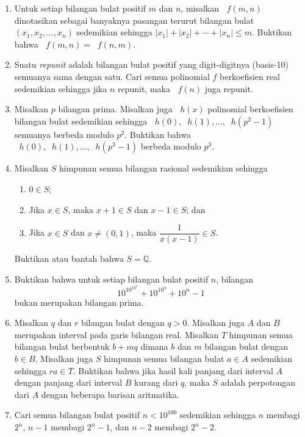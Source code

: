 \documentclass[12pt]{article}
\newcommand*\func[2]{\mathop{}\!{#1}{\left({#2}\right)}}
\begin{document}
\begin{enumerate}[leftmargin=*]
		\item Untuk setiap bilangan bulat positif $ m $ dan $ n $, misalkan $ \func{f}{m, n} $ dinotasikan sebagai banyaknya pasangan terurut bilangan bulat $ \left(x_{1}, x_{2}, \dots, x_{n}\right) $ sedemikian sehingga $ \left|x_{1}\right| + \left|x_{2}\right| + \cdots + \left|x_{n}\right| \leq m $. Buktikan bahwa $ \func{f}{m, n} = \func{f}{n, m} $.
		\item Suatu \textit{repunit} adalah bilangan bulat positif yang digit-digitnya (basis-10) semuanya sama dengan satu. Cari semua polinomial $ f $ berkoefisien real sedemikian sehingga jika $ n $ repunit, maka $ \func{f}{n} $ juga repunit.
		\item Misalkan $ p $ bilangan prima. Misalkan juga $ \func{h}{x} $ polinomial berkoefisien bilangan bulat sedemikian sehingga $ \func{h}{0}, \func{h}{1}, \dots, \func{h}{p^{2} - 1} $ semuanya berbeda modulo $ p^{2} $. Buktikan bahwa $ \func{h}{0}, \func{h}{1}, \dots, \func{h}{p^{3} - 1} $ berbeda modulo $ p^{3} $.
		\item Misalkan $ S $ himpunan semua bilangan rasional sedemikian sehingga
		\begin{enumerate}
			\item $ 0 \in S $;
			\item Jika $ x \in S $, maka $ x + 1 \in S $ dan $ x - 1 \in S $; dan
			\item Jika $ x \in S $ dan $ x \ne \left(0, 1\right) $, maka $ \dfrac{1}{x\left(x - 1\right)} \in S $.
		\end{enumerate}
		Buktikan atau bantah bahwa $ S = \mathbb{Q} $.
		\item Buktikan bahwa untuk setiap bilangan bulat positif $ n $, bilangan
		\[ 10^{10^{10^{n}}} + 10^{10^{n}} + 10^{n} - 1 \]
		bukan merupakan bilangan prima.
		\item Misalkan $ q $ dan $ r $ bilangan bulat dengan $ q > 0 $. Misalkan juga $ A $ dan $ B $ merupakan interval pada garis bilangan real. Misalkan $ T $ himpunan semua bilangan bulat berbentuk $ b + mq $ dimana $ b $ dan $ m $ bilangan bulat dengan $ b \in B $. Misalkan juga $ S $ himpunan semua bilangan bulat $ a \in A $ sedemikian sehingga $ ra \in T $. Buktikan bahwa jika hasil kali panjang dari interval $ A $ dengan panjang dari interval $ B $ kurang dari $ q $, maka $ S $ adalah perpotongan dari $ A $ dengan beberapa barisan aritmatika.
		\item Cari semua bilangan bulat positif $ n < 10^{100} $ sedemikian sehingga $ n $ membagi $ 2^{n} $, $ n - 1 $ membagi $ 2^{n} - 1 $, dan $ n - 2 $ membagi $ 2^{n} - 2 $.

\end{enumerate}
\end{document}
